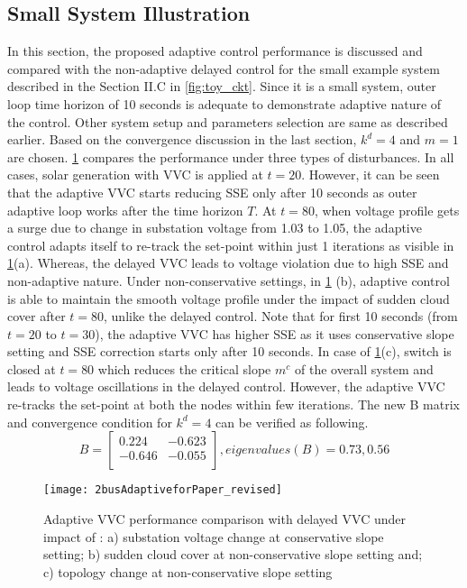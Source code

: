 \documentclass[journal]{IEEEtran}
\begin{document}
\subsection{Small System Illustration}
{In this section, the proposed adaptive control performance is discussed and compared with the non-adaptive delayed control for the small example system described in the Section II.C in} \figurename \ref{fig:toy_ckt}. {Since it is a small system, outer loop time horizon of 10 seconds is adequate to demonstrate adaptive nature of the control. Other system setup and parameters selection are same as described earlier. Based on the convergence discussion in the last section, $k^d=4$ and $m=1$ are chosen. }\figurename \ref{fig:toy_adaptive} {compares the performance under three types of disturbances. In all cases, solar generation with VVC is applied at $t=20$. However, it can be seen that the adaptive VVC starts reducing SSE only after 10 seconds as outer adaptive loop works after the time horizon $T$. At $t=80$, when voltage profile gets a surge due to change in substation voltage from 1.03 to 1.05, the adaptive control adapts itself to re-track the set-point within just 1 iterations as visible in }\figurename \ref{fig:toy_adaptive}(a). {Whereas, the delayed VVC leads to voltage violation due to high SSE and non-adaptive nature. Under non-conservative settings, in} \figurename \ref{fig:toy_adaptive} {(b), adaptive control is able to maintain the smooth voltage profile under the impact of sudden cloud cover after $t=80$, unlike the delayed control. Note that for first 10 seconds (from $t=20$ to $t=30$), the adaptive VVC has higher SSE as it uses conservative slope setting and SSE correction starts only after 10 seconds. In case of }\figurename \ref{fig:toy_adaptive}{(c), switch is closed at $t=80$ which reduces the critical slope $m^c$ of the overall system and leads to voltage oscillations in the delayed control. However, the adaptive VVC re-tracks the set-point at both the nodes within few iterations. The new B matrix and convergence condition for $k^d=4$ can be verified as following.}
\begin{equation*}
B=\begin{bmatrix}
0.224 & -0.623\\
-0.646& -0.055\\
\end{bmatrix}, eigenvalues(B)=0.73, 0.56
\end{equation*}

\begin{figure}
	\centering
	\texttt{[image: 2busAdaptiveforPaper\_revised]}
    \caption { Adaptive VVC performance comparison with delayed VVC under impact of : a) substation voltage change at conservative slope setting; b) sudden cloud cover at non-conservative slope setting and; c) topology change at non-conservative slope setting}
    \label{fig:toy_adaptive}   
\end{figure} 
\end{document}
